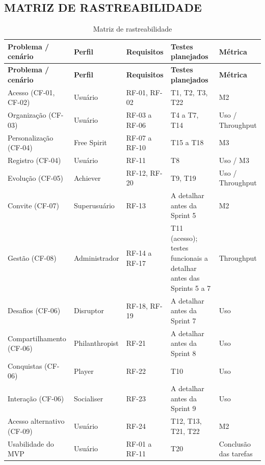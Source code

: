 \subsection{MATRIZ DE RASTREABILIDADE}

\begingroup
\small
\setlength{\tabcolsep}{4pt}
\renewcommand{\arraystretch}{1.2}
\begin{longtable}{|>{\raggedright\arraybackslash}p{}|>{\raggedright\arraybackslash}p{}|>{\raggedright\arraybackslash}p{}|>{\raggedright\arraybackslash}p{}|>{\raggedright\arraybackslash}p{}|}
\caption{Matriz de rastreabilidade}\\
\hline
\textbf{Problema / cenário} & \textbf{Perfil} & \textbf{Requisitos} & \textbf{Testes planejados} & \textbf{Métrica} \\ \hline
\endfirsthead
\textbf{Problema / cenário} & \textbf{Perfil} & \textbf{Requisitos} & \textbf{Testes planejados} & \textbf{Métrica} \\ \hline
\endhead
Acesso (CF-01, CF-02) & Usuário & RF-01, RF-02 & T1, T2, T3, T22 & M2 \\ \hline
Organização (CF-03) & Usuário & RF-03 a RF-06 & T4 a T7, T14 & Uso / Throughput \\ \hline
Personalização (CF-04) & Free Spirit & RF-07 a RF-10 & T15 a T18 & M3 \\ \hline
Registro (CF-04) & Usuário & RF-11 & T8 & Uso / M3 \\ \hline
Evolução (CF-05) & Achiever & RF-12, RF-20 & T9, T19 & Uso / Throughput \\ \hline
Convite (CF-07) & Superusuário & RF-13 & A detalhar antes da Sprint 5 & M2 \\ \hline
Gestão (CF-08) & Administrador & RF-14 a RF-17 & T11 (acesso); testes funcionais a detalhar antes das Sprints 5 a 7 & Throughput \\ \hline
Desafios (CF-06) & Disruptor & RF-18, RF-19 & A detalhar antes da Sprint 7 & Uso \\ \hline
Compartilhamento (CF-06) & Philanthropist & RF-21 & A detalhar antes da Sprint 8 & Uso \\ \hline
Conquistas (CF-06) & Player & RF-22 & T10 & Uso \\ \hline
Interação (CF-06) & Socialiser & RF-23 & A detalhar antes da Sprint 9 & Uso \\ \hline
Acesso alternativo (CF-09) & Usuário & RF-24 & T12, T13, T21, T22 & M2 \\ \hline
Usabilidade do MVP & Usuário & RF-01 a RF-11 & T20 & Conclusão das tarefas \\ \hline
\end{longtable}
\endgroup
